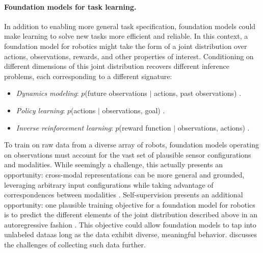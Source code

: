 \paragraph{Foundation models for task learning.} In addition to enabling more general task specification, foundation models could make learning to solve new tasks more efficient and reliable. In this context, a foundation model for robotics might take the form of a joint distribution over actions, observations, rewards, and other properties of interest. Conditioning on different dimensions of this joint distribution recovers different inference problems, each corresponding to a different signature:
\begin{itemize} 
    \item \textit{Dynamics modeling}: $p$(future observations $\mid$ actions, past observations) \citep{finn2017deep, hafner2019latent, wu2021greedy}.
    \item \textit{Policy learning}: $p$(actions $\mid$ observations, goal) \citep{kaelbling1993learning, schaul2015uvf, ding2019goal}.
    \item \textit{Inverse reinforcement learning}: $p$(reward function $\mid$ observations, actions) \citep{ng2000algorithms, ziebart2008maximum, finn2016guided}.
\end{itemize}
To train on raw data from a diverse array of robots, foundation models operating on observations must account for the vast set of plausible sensor configurations and modalities. While seemingly a challenge, this actually presents an opportunity: cross-modal representations can be more general and grounded, leveraging arbitrary input configurations while taking advantage of correspondences between modalities \citep{kaiser2017one, li2019connecting, lee2020detect, lee2020multimodal, alayrac2020self, jaegle2021perceiver}. Self-supervision presents an additional opportunity: one plausible training objective for a foundation model for robotics is to predict the different elements of the joint distribution described above in an autoregressive fashion  \citep[][]{Janner2021ReinforcementLA, Chen2021DecisionTR}. This objective could allow foundation models to tap into unlabeled data\dash{}as long as the data exhibit diverse, meaningful behavior.  discusses the challenges of collecting such data further.

